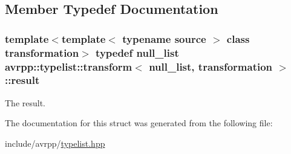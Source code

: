 \subsection{Member Typedef Documentation}
\hypertarget{structavrpp_1_1typelist_1_1transform_3_01null__list_00_01transformation_01_4_af438de175dc6b93e39795bc0913427c3}{
\subsubsection[{result}]{\setlength{\rightskip}{0pt plus 5cm}template$<$template$<$ typename source $>$ class transformation$>$ typedef {\bf null\_\-list} avrpp::typelist::transform$<$ {\bf null\_\-list}, transformation $>$::{\bf result}}}
\label{structavrpp_1_1typelist_1_1transform_3_01null__list_00_01transformation_01_4_af438de175dc6b93e39795bc0913427c3}


The result. 



The documentation for this struct was generated from the following file:\begin{DoxyCompactItemize}
\item 
include/avrpp/\hyperlink{typelist_8hpp}{typelist.hpp}\end{DoxyCompactItemize}
